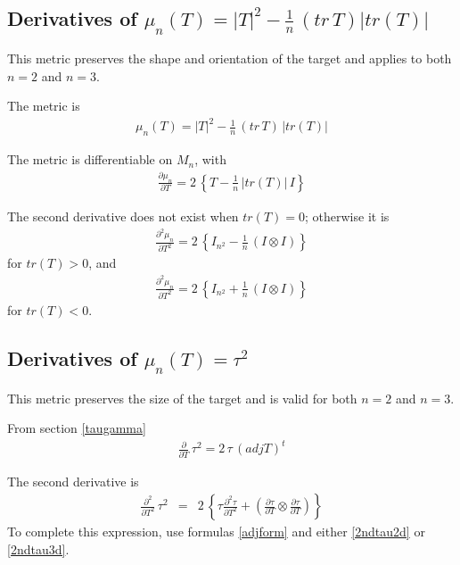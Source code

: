 \documentclass{report}
\begin{document}
\subsection{Derivatives of $\mu_n(T)=|T|^2 - \frac{1}{n} \, (tr \, T) |tr(T)|$ \label{si+}}

This metric preserves the shape and orientation of the target and applies 
to both $n=2$ and $n=3$. \newline

\noindent The metric is
\begin{eqnarray}
\mu_n(T)=|T|^2 - \frac{1}{n} \, (tr \, T) \, |tr(T)|
\end{eqnarray}

\noindent The metric is differentiable on $M_n$, with
\begin{eqnarray}
\frac{\partial \mu_n}{\partial T} = 2 \, \left\{ T - \frac{1}{n} \, |tr(T)| \, I \right\} \label{derv1-si+}
\end{eqnarray}

\noindent The second derivative does not exist when $tr(T)=0$; otherwise 
it is  
\begin{eqnarray}
\frac{\partial^2 \mu_n}{\partial T^2} = 2 \, \left\{ I_{n^2} - \frac{1}{n} \, \left( I \otimes I \right) \right\}
\end{eqnarray}
for $tr(T) > 0$, and 
\begin{eqnarray}
\frac{\partial^2 \mu_n}{\partial T^2} = 2 \, \left\{ I_{n^2} + \frac{1}{n} \, \left( I \otimes I \right) \right\}
\end{eqnarray}
for $tr(T) < 0$. \newline

\subsection{Derivatives of $\mu_n(T) = \tau^2$ \label{tausqr} }

\noindent This metric preserves the size of the target and is valid for both $n=2$ and $n=3$. \newline

\noindent From section \ref{taugamma}
\begin{eqnarray}
\frac{\partial}{\partial T} \, \tau^2 = 2 \, \tau \, (adj T)^t
\end{eqnarray}

\noindent The second derivative is
\begin{eqnarray}
\frac{\partial^2}{\partial T^2} \, \tau^2 & = & 2 \, \left\{ \tau \frac{\partial^2 \tau}{\partial T^2} + \left( \frac{\partial \tau}{\partial T} \otimes \frac{\partial \tau}{\partial T} \right) \right\}
\end{eqnarray}
To complete this expression, use formulas \ref{adjform} and either 
\ref{2ndtau2d} or \ref{2ndtau3d}. \newline
\end{document}
